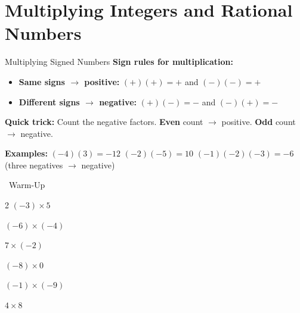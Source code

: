 \section{Multiplying Integers and Rational Numbers}

\begin{quickReview}{Multiplying Signed Numbers}
\textbf{Sign rules for multiplication:}

\begin{itemize}[leftmargin=*]
    \item \textbf{Same signs $\to$ positive:} $(+)(+) = +$ \quad and \quad $(-)(-)= +$
    \item \textbf{Different signs $\to$ negative:} $(+)(-) = -$ \quad and \quad $(-)(+) = -$
\end{itemize}

\medskip
\textbf{Quick trick:} Count the negative factors. \textbf{Even} count $\to$ positive. \textbf{Odd} count $\to$ negative.

\smallskip
\textbf{Examples:} $(-4)(3) = -12$ \quad $(-2)(-5) = 10$ \quad $(-1)(-2)(-3) = -6$ (three negatives $\to$ negative)
\end{quickReview}

\begin{practiceBox}[funGreen]{\faSun~Warm-Up}


\begin{multicols}{2}
\prob $(-3) \times 5$ \answerBlank[2cm]

\prob $(-6) \times (-4)$ \answerBlank[2cm]

\prob $7 \times (-2)$ \answerBlank[2cm]

\prob $(-8) \times 0$ \answerBlank[2cm]

\prob $(-1) \times (-9)$ \answerBlank[2cm]

\prob $4 \times 8$ \answerBlank[2cm]
\end{multicols}
\end{practiceBox}

